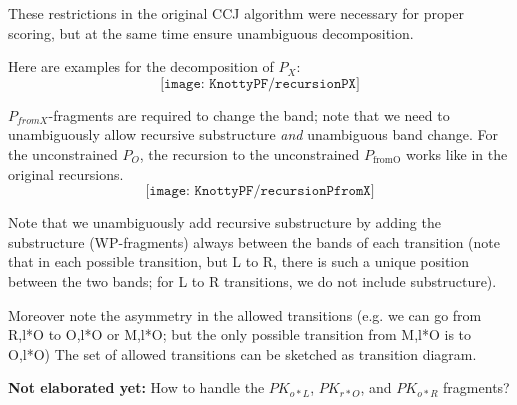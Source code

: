 \documentclass[11pt]{article} %
\begin{document}
These restrictions in the original CCJ algorithm were necessary for proper scoring, but at the same time ensure unambiguous decomposition. 


Here are examples for the decomposition of $P_X$:
\begin{equation}
\texttt{[image: KnottyPF/recursionPX]}
\end{equation}

$P_{fromX}$-fragments are required to change the band; note that we need to unambiguously allow recursive substructure \emph{and} unambiguous band change. For the unconstrained $P_O$, the recursion to the unconstrained $P_\text{fromO}$ works like in the original recursions. 
\begin{equation}
\texttt{[image: KnottyPF/recursionPfromX]}
\end{equation}

Note that we unambiguously add recursive substructure by adding the substructure (WP-fragments) always between the bands of each transition (note that in each possible transition, but L to R, there is such a unique position between the two bands; for L to R transitions, we do not include substructure).

Moreover note the asymmetry in the allowed transitions (e.g. we can go from R,l*O to O,l*O or M,l*O; but the only possible transition from M,l*O is to O,l*O)  The set of allowed transitions can be sketched as transition diagram.



\textbf{Not elaborated yet:} How to handle the $PK_{o*L}$, $PK_{r*O}$, and $PK_{o*R}$ fragments?
\end{document}
